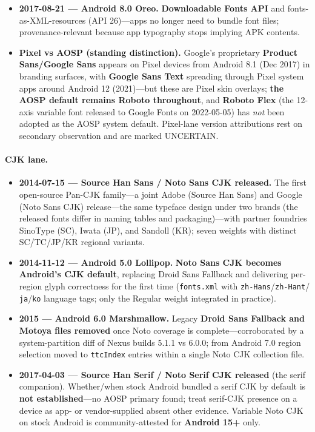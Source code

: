 \documentclass[10pt,a4paper]{article}
\newcommand{\code}[1]{\texttt{#1}}
\begin{document}
\begin{itemize}[leftmargin=1.2em,itemsep=2pt]
shipment are distinct dated events.\cite{a-roboto2,a-roboto2-2,a-lollipop}
\item \textbf{2017-08-21 --- Android 8.0 Oreo.} \textbf{Downloadable Fonts API} and
fonts-as-XML-resources (API 26)---apps no longer need to bundle font files;
provenance-relevant because app typography stops implying APK contents.\cite{a-oreo}
\item \textbf{Pixel vs AOSP (standing distinction).} Google's proprietary \textbf{Product
Sans/Google Sans} appears on Pixel devices from Android 8.1 (Dec 2017) in branding
surfaces, with \textbf{Google Sans Text} spreading through Pixel system apps around
Android 12 (2021)---but these are Pixel skin overlays; \textbf{the AOSP default remains
Roboto throughout}, and \textbf{Roboto Flex} (the 12-axis variable font released to
Google Fonts on 2022-05-05) has \emph{not} been adopted as the AOSP system default.
Pixel-lane version attributions rest on secondary observation and are marked
UNCERTAIN.\cite{a-gsans,a-flex,a-flex-2}
\end{itemize}

\paragraph{CJK lane.}
\begin{itemize}[leftmargin=1.2em,itemsep=2pt]
\item \textbf{2014-07-15 --- Source Han Sans / Noto Sans CJK released.} The first
open-source Pan-CJK family---a joint Adobe (Source Han Sans) and Google (Noto Sans CJK)
release---the same typeface design under two brands (the released fonts differ in
naming tables and packaging)---with partner foundries SinoType (SC), Iwata
(JP), and Sandoll (KR); seven weights with distinct SC/TC/JP/KR regional
variants.\cite{a-shs,a-shs-2}
\item \textbf{2014-11-12 --- Android 5.0 Lollipop.} \textbf{Noto Sans CJK becomes
Android's CJK default}, replacing Droid Sans Fallback and delivering per-region glyph
correctness for the first time (\code{fonts.xml} with \code{zh-Hans}/\code{zh-Hant}/
\code{ja}/\code{ko} language tags; only the Regular weight integrated in
practice).\cite{a-shs,a-shs-2,a-shs75}
\item \textbf{2015 --- Android 6.0 Marshmallow.} Legacy \textbf{Droid Sans Fallback and
Motoya files removed} once Noto coverage is complete---corroborated by a
system-partition diff of Nexus builds 5.1.1 vs 6.0.0; from Android 7.0 region selection
moved to \code{ttcIndex} entries within a single Noto CJK collection
file.\cite{a-cjk-remove}
\item \textbf{2017-04-03 --- Source Han Serif / Noto Serif CJK released} (the serif
companion). Whether/when stock Android bundled a serif CJK by default is \textbf{not
established}---no AOSP primary found; treat serif-CJK presence on a device as app- or
vendor-supplied absent other evidence. Variable Noto CJK on stock Android is
community-attested for \textbf{Android 15+} only.\cite{a-shserif,a-cjk-vf,a-cjk-vf-2}
\end{itemize}
\end{document}
